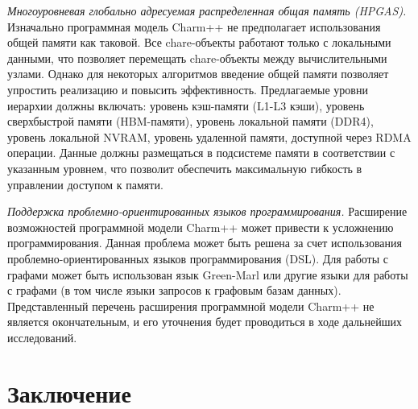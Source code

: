 \documentclass[11pt, oneside, a4paper]{article}
\begin{document}
\textit{Многоуровневая глобально адресуемая распределенная общая память (HPGAS).} Изначально программная модель Charm++ не предполагает использования общей памяти как таковой. Все chare-объекты работают только с локальными данными, что позволяет перемещать chare-объекты между вычислительными узлами. Однако для некоторых алгоритмов введение общей памяти позволяет упростить реализацию и повысить эффективность. Предлагаемые уровни иерархии должны включать: уровень кэш-памяти (L1-L3 кэши), уровень сверхбыстрой памяти (HBM-памяти), уровень локальной памяти (DDR4), уровень локальной NVRAM, уровень удаленной памяти, доступной через RDMA операции. Данные должны размещаться в подсистеме памяти в соответствии с указанным уровнем, что позволит обеспечить максимальную гибкость в управлении доступом к памяти. 

\textit{Поддержка проблемно-ориентированных языков программирования.} Расширение возможностей программной модели Charm++ может привести к усложнению программирования. Данная проблема может быть решена за счет использования проблемно-ориентированных языков программирования (DSL). Для работы с графами может быть использован язык Green-Marl \cite{Hong:2012:GDE:2150976.2151013} или другие языки для работы с графами (в том числе языки запросов к графовым базам данных).
Представленный перечень расширения программной модели Charm++ не является окончательным, и его уточнения будет проводиться в ходе дальнейших исследований.

\section{Заключение}
\end{document}
